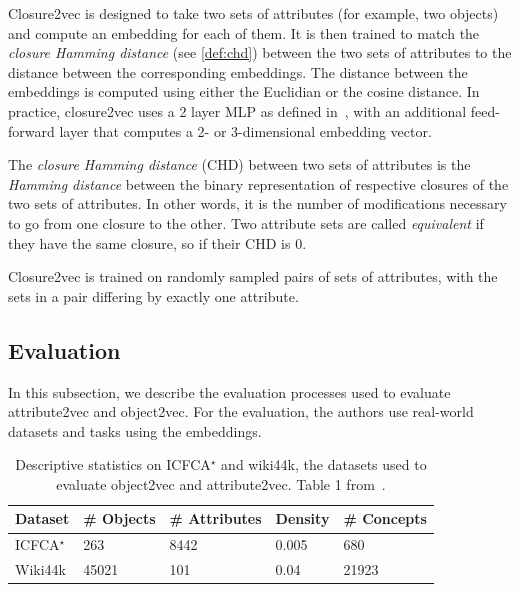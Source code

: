 {Closure2vec} is designed to take two sets of attributes (for example, two objects) and compute an embedding for each of them.
It is then trained to match the \textit{closure Hamming distance} (see \cref{def:chd}) between the two sets of attributes to the distance between the corresponding embeddings. The distance between the embeddings is computed using either the Euclidian or the cosine distance.
In practice, {closure2vec} uses a 2 layer MLP as defined in~\cite{encoding:2007:rudolph}, with an additional feed-forward layer that computes a 2- or 3-dimensional embedding vector.

\begin{definition}\label{def:chd}
The \emph{closure Hamming distance} (CHD) between two sets of attributes is the \emph{Hamming distance} between the binary representation of respective closures of the two sets of attributes. In other words, it is the number of modifications necessary to go from one closure to the other.
Two attribute sets are called \emph{equivalent} if they have the same closure, so if their CHD is 0.
\end{definition}

{Closure2vec} is trained on randomly sampled pairs of sets of attributes, with the sets in a pair differing by exactly one attribute.

\subsection{Evaluation}\label{sec:fca2vec-evaluation}
In this subsection, we describe the evaluation processes used to evaluate {attribute2vec} and {object2vec}.
For the evaluation, the authors use real-world datasets and tasks using the embeddings.


\begin{table}
    \centering
    \begin{tabular}{lllll}
    \toprule
    Dataset & \# Objects & \# Attributes & Density & \# Concepts\\
    \midrule
    ICFCA$^\star$ & 263 & 8442 & 0.005 & 680 \\
    Wiki44k & 45021 & 101 & 0.04 & 21923\\
    \bottomrule
    \end{tabular}
    \caption{Descriptive statistics on ICFCA$^\star$ and wiki44k, the datasets used to evaluate {object2vec} and {attribute2vec}. Table 1 from~\cite{fca2vec:2019:durrschnabel}.}
    \label{tab:fca2vec-datasets}
\end{table}

